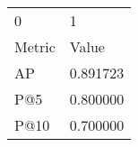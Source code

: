 \begin{tabular}{ll}
0 & 1 \\
Metric & Value \\
AP & 0.891723 \\
P@5 & 0.800000 \\
P@10 & 0.700000 \\
\end{tabular}

